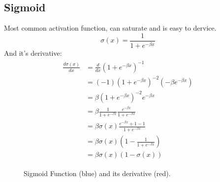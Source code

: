 \subsection{Sigmoid}
Most common activation function, can saturate and is easy to dervice.
\begin{equation}\label{ed:sigmoid}
\sigma(x) = \frac{1}{1 + e^{-\beta x}}
\end{equation}
And it's derivative:
\begin{align}\label{ed:sigmoid_derivative}
\begin{split}
\frac{d\sigma(x)}{dx} &= \frac{d}{dx} (1 + e^{-\beta x})^{-1}\\
&= (-1) (1 + e^{-\beta x})^{-2} (-\beta e^{-\beta x})\\
&= \beta (1 + e^{-\beta x})^{-2} e^{-\beta x}\\
&= \beta \frac{1}{1 + e^{-\beta x}} \frac{e^{-\beta x}}{1 + e^{-\beta x}}\\
&= \beta \sigma(x) \frac{e^{-\beta x} + 1 - 1}{1 + e^{-\beta x}}\\
&= \beta \sigma(x) (1 - \frac{1}{1 + e^{-\beta x}})\\
&= \beta \sigma(x) (1 - \sigma(x))
\end{split}
\end{align}
\begin{figure}
\centering
{}
\caption{Sigmoid Function (blue) and its derivative (red).}
\end{figure}

